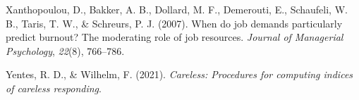 \documentclass[
  man,mask]{apa7}
\newlength{\cslhangindent}
\newlength{\cslentryspacingunit} %
\newenvironment{CSLReferences}[2] %
 {%
  \setlength{\parindent}{0pt}
  \ifodd #1
  \let\oldpar\par
  \def\par{\hangindent=\cslhangindent\oldpar}
  \fi
  \setlength{\parskip}{#2\cslentryspacingunit}
 }%
 {}
\begin{document}
\begin{CSLReferences}{1}{0}
\leavevmode{}%
Xanthopoulou, D., Bakker, A. B., Dollard, M. F., Demerouti, E., Schaufeli, W. B., Taris, T. W., \& Schreurs, P. J. (2007). When do job demands particularly predict burnout? The moderating role of job resources. \emph{Journal of Managerial Psychology}, \emph{22}(8), 766--786.

\leavevmode{}%
Yentes, R. D., \& Wilhelm, F. (2021). \emph{Careless: Procedures for computing indices of careless responding}.

\end{CSLReferences}

\endgroup
\end{document}
